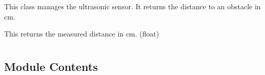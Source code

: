 \documentclass[letterpaper,10pt,english]{sphinxmanual}
\begin{document}
\begin{fulllineitems}
\label{\detokenize{autoapi/robotlibrary/ultrasonic/index:robotlibrary.ultrasonic.Ultra}}
\pysigstartsignatures
{}
\pysigstopsignatures
\sphinxAtStartPar
This class manages the ultrasonic sensor. It returns the distance to an obstacle in cm.

\begin{fulllineitems}
\label{\detokenize{autoapi/robotlibrary/ultrasonic/index:robotlibrary.ultrasonic.Ultra.get_dist}}
\pysigstartsignatures
{}
\pysigstopsignatures
\sphinxAtStartPar
This returns the measured distance in cm. (float)

\end{fulllineitems}


\end{fulllineitems}


\sphinxstepscope


\section{}
\label{\detokenize{autoapi/conf/index:module-conf}}\label{\detokenize{autoapi/conf/index:conf}}\label{\detokenize{autoapi/conf/index::doc}}

\subsection{Module Contents}
\label{\detokenize{autoapi/conf/index:module-contents}}

\begin{fulllineitems}
\label{\detokenize{autoapi/conf/index:conf.project}}
\pysigstartsignatures
{}
\pysigstopsignatures
\end{fulllineitems}
\end{document}
